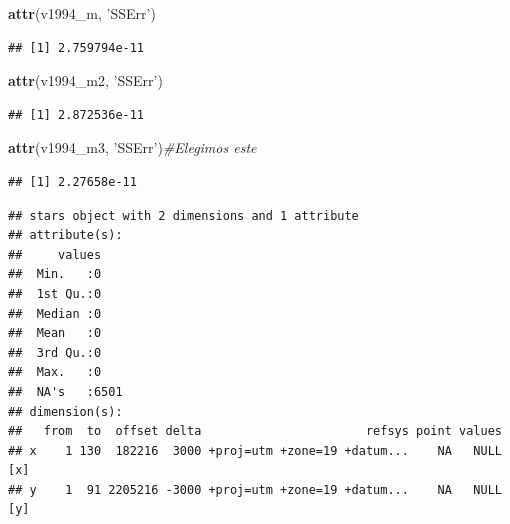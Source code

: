 \documentclass[11pt,]{article}
\newenvironment{Shaded}{\begin{snugshade}}{\end{snugshade}}
\newcommand{\KeywordTok}[1]{\textcolor[rgb]{0.13,0.29,0.53}{\textbf{#1}}}
\newcommand{\DataTypeTok}[1]{\textcolor[rgb]{0.13,0.29,0.53}{#1}}
\newcommand{\DecValTok}[1]{\textcolor[rgb]{0.00,0.00,0.81}{#1}}
\newcommand{\StringTok}[1]{\textcolor[rgb]{0.31,0.60,0.02}{#1}}
\newcommand{\CommentTok}[1]{\textcolor[rgb]{0.56,0.35,0.01}{\textit{#1}}}
\newcommand{\OperatorTok}[1]{\textcolor[rgb]{0.81,0.36,0.00}{\textbf{#1}}}
\newcommand{\NormalTok}[1]{#1}
\begin{document}
\begin{Shaded}
\begin{Highlighting}[]
\KeywordTok{attr}\NormalTok{(v1994_m, }\StringTok{'SSErr'}\NormalTok{) }
\end{Highlighting}
\end{Shaded}

\begin{verbatim}
## [1] 2.759794e-11
\end{verbatim}

\begin{Shaded}
\begin{Highlighting}[]
\KeywordTok{attr}\NormalTok{(v1994_m2, }\StringTok{'SSErr'}\NormalTok{)}
\end{Highlighting}
\end{Shaded}

\begin{verbatim}
## [1] 2.872536e-11
\end{verbatim}

\begin{Shaded}
\begin{Highlighting}[]
\KeywordTok{attr}\NormalTok{(v1994_m3, }\StringTok{'SSErr'}\NormalTok{)}\CommentTok{#Elegimos este}
\end{Highlighting}
\end{Shaded}

\begin{verbatim}
## [1] 2.27658e-11
\end{verbatim}

\begin{Shaded}
\end{Shaded}

\begin{verbatim}
## stars object with 2 dimensions and 1 attribute
## attribute(s):
##     values     
##  Min.   :0     
##  1st Qu.:0     
##  Median :0     
##  Mean   :0     
##  3rd Qu.:0     
##  Max.   :0     
##  NA's   :6501  
## dimension(s):
##   from  to  offset delta                       refsys point values    
## x    1 130  182216  3000 +proj=utm +zone=19 +datum...    NA   NULL [x]
## y    1  91 2205216 -3000 +proj=utm +zone=19 +datum...    NA   NULL [y]
\end{verbatim}
\end{document}
